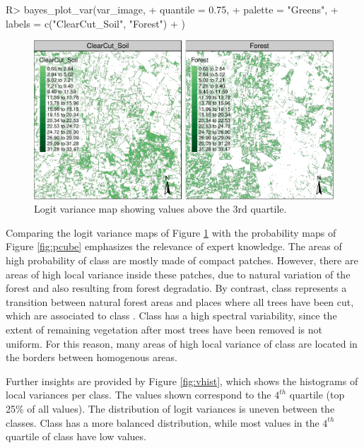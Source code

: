 \documentclass[
  shortnames]{jss}
\begin{document}
\begin{CodeChunk}
\begin{CodeInput}
R> bayes_plot_var(var_image,
+   quantile = 0.75,
+   palette = "Greens",
+   labels = c("ClearCut_Soil", "Forest")
+ )
\end{CodeInput}
\begin{figure}[h]

{\centering \includegraphics{Bayesian_smoothing_JSS_files/figure-latex/vcube-1} 

}

\caption[Logit variance map showing values above the 3rd quartile]{Logit variance map showing values above the 3rd quartile.}\label{fig:vcube}
\end{figure}
\end{CodeChunk}

Comparing the logit variance maps of Figure \ref{fig:vcube} with the probability maps of Figure \ref{fig:pcube} emphasizes the relevance of expert knowledge. The areas of high probability of class  are mostly made of compact patches. However, there are areas of high local variance inside these patches, due to natural variation of the forest and also resulting from forest degradatio. By contrast, class  represents a transition between natural forest areas and places where all trees have been cut, which are associated to class . Class  has a high spectral variability, since the extent of remaining vegetation after most trees have been removed is not uniform. For this reason, many areas of high local variance of class  are located in the borders between homogenous areas.

Further insights are provided by Figure \ref{fig:vhist}, which shows the histograms of local variances per class. The values shown correspond to the \(4^{th}\) quartile (top 25\% of all values). The distribution of logit variances is uneven between the classes. Class  has a more balanced distribution, while most values in the \(4^{th}\) quartile of class  have low values.
\end{document}
